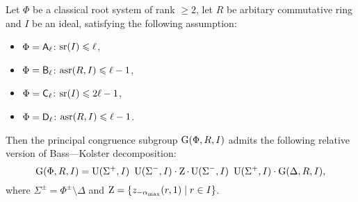 \begin{thm}\label{thm:BassKolster}
Let $\Phi$ be a classical root system of rank $\geqslant2$, let $R$ be arbitary commutative ring and $I$ be an ideal, satisfying the following assumption:
\begin{itemize}
\item $\Phi=\mathsf{A}_\ell$: $\operatorname{sr}(I)\leqslant\ell$,
\item $\Phi=\mathsf{B}_\ell$: $\operatorname{asr}(R,I)\leqslant\ell-1$,
\item $\Phi=\mathsf{C}_\ell$: $\operatorname{sr}(I)\leqslant2\ell-1$,
\item $\Phi=\mathsf{D}_\ell$: $\operatorname{asr}(R,I)\leqslant\ell-1$.
\end{itemize}
Then the principal congruence subgroup $\operatorname{G}(\Phi,R,I)$ admits the following relative version of Bass---Kolster decomposition:
\[\operatorname{G}(\Phi,R,I)=\operatorname{U}(\Sigma^+,I)\ \operatorname{U}(\Sigma^-,I)\cdot \operatorname{Z}\cdot \operatorname{U}(\Sigma^-,I)\ \operatorname{U}(\Sigma^+,I)\cdot \operatorname{G}(\Delta,R,I), \]
where $\Sigma^\pm=\Phi^\pm\setminus\Delta$ and $\operatorname{Z}=\left\{ z_{-\alpha_\mathrm{max}}(r,1)\mid r\in I \right\}$.
\end{thm}
